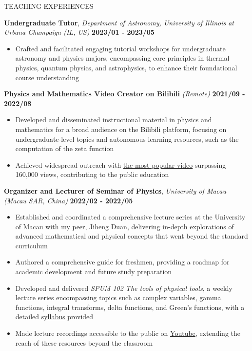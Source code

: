 \documentclass[11pt]{article} %
\begin{document}
\begin{section}{TEACHING EXPERIENCES}

\textbf{Undergraduate Tutor}, \textit{Department of Astronomy, University of Illinois at Urbana-Champaign (IL, US)} \hfill \textbf{2023/01 - 2023/05}
\begin{itemize}[leftmargin=1.5em]
    \item Crafted and facilitated engaging tutorial workshops for undergraduate astronomy and physics majors, encompassing core principles in thermal physics, quantum physics, and astrophysics, to enhance their foundational course understanding
\end{itemize}

\textbf{Physics and Mathematics Video Creator on Bilibili} \textit{(Remote)} \hfill \textbf{2021/09 - 2022/08}
\begin{itemize}[leftmargin=1.5em]
    \item Developed and disseminated instructional material in physics and mathematics for a broad audience on the Bilibili platform, focusing on undergraduate-level topics and autonomous learning resources, such as the computation of the zeta function
    \item Achieved widespread outreach with \href{https://www.bilibili.com/video/BV1th411W7xu/}{the most popular video} surpassing 160,000 views, contributing to the public education
\end{itemize}

\textbf{Organizer and Lecturer of Seminar of Physics}, \textit{University of Macau (Macau SAR, China)} \hfill \textbf{2022/02 - 2022/05}
\begin{itemize}[leftmargin=1.5em]
    \item Established and coordinated a comprehensive lecture series at the University of Macau with my peer, \href{http://runawayfancy.me/}{Jiheng Duan}, delivering in-depth explorations of advanced mathematical and physical concepts that went beyond the standard curriculum
    \item Authored a comprehensive guide for freshmen, providing a roadmap for academic development and future study preparation
    \item Developed and delivered \textit{SPUM 102 The tools of physical tools}, a weekly lecture series encompassing topics such as complex variables, gamma functions, integral transforms, delta functions, and Green's functions, with a detailed \href{https://github.com/Chisen-Lupus/Seminar-of-Physics-UM/blob/main/SPUM%20102%20The%20tools%20of%20physical%20tool.pdf}{syllabus} provided
    \item Made lecture recordings accessible to the public on \href{https://www.youtube.com/watch?v=nQkv03r-XeQ&list=PLV9fHDZW7hHWQ9rrAk7c9kdeV-Lqyt7pV&index=10}{Youtube}, extending the reach of these resources beyond the classroom
\end{itemize}


\end{section}
\end{document}
